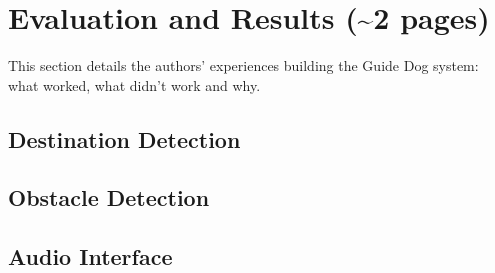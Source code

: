 \section{Evaluation and Results (\textasciitilde 2 pages)}
\label{sec:eval}

This section details the authors' experiences building the Guide Dog system:
what worked, what didn't work and why.

\subsection{Destination Detection}
\label{sec:eval-dest}


\subsection{Obstacle Detection}
\label{sec:eval-obs}


\subsection{Audio Interface}
\label{sec:eval-audio}
